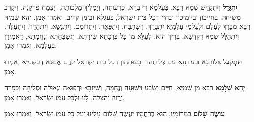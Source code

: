 
\textbf{יִתְגַּדַּל} וְיִתְקַדַּשׁ שְׁמֵהּ רַבָּא.  בְּעָלְמָא דִּי בְרָא, כִּרְעוּתֵה, וְיַמְלִיךְ מַלְכוּתֵה, וְיַצְמַח פֻּרְקָנֵה, וִיקָרֵב מְשִׁיחֵהּ.  בְּחַיֵּיכוֹן וּבְיוֹמֵיכוֹן וּבְחַיֵּי דְכָל בֵּית יִשְׂרָאֵל, בַּעֲגָלָא וּבִזְמַן קָרִיב, וְאִמְרוּ אָמֵן.  יְהֵא שְׁמֵיהּ רַבָּא מְבָרַךְ לְעָלַם וּלְעָלְמֵי עָלְמַיָּא יִתְבָּרַךְ. וְיִשְׁתַּבַּח. וְיִתְפָּאַר. וְיִתְרוֹמַם. וְיִתְנַשֵּׂא. וְיִתְהַדָּר. וְיִתְעַלֶּה. וְיִתְהַלָּל שְׁמֵהּ דְּקֻדְשָׁא, בְּרִיךְ הוּא.  לְעֵלָּא מִן כָּל בִּרְכָתָא שִׁירָתָא, תֻּשְׁבְּחָתָא וְנֶחֱמָתָא, דַּאֲמִירָן בְּעָלְמָא, וְאִמְרוּ אָמֵן: 

\textbf{תִּתְקַבַּל} צְלוֹתָנָא וּבָעוּתָנָא עִם צְלוֹתְהוֹן וּבָעוּתְהוֹן דְכָל בֵּית יִשְׂרָאֵל קֹדֶם אֲבוּנָא דְבִשְׁמַיָּא וְאִמְרוּ אָמֵן. 

\textbf{יְהֵא שְׁלָמָא} רַבָּא מִן שְׁמַיָּא, חַיִּים וְשָׂבָע וִישׁוּעָה וְנֶחָמָה, וְשֵׁיזָבָא וּרְפוּאָה וּגְאוּלָה וּסְלִיחָה וְכַפָּרָה וְרֶוַח וְהַצָּלָה, לָנוּ וּלְכָל עַמּוֹ יִשְׂרָאֵל, וְאִמְרוּ אָמֵן. 

\textbf{עוֹשֶׂה שָׁלוֹם} בִמְרוֹמָיו, הוּא בְּרַחֲמָיו יַעֲשֶׂה שָׁלוֹם עָלֵינוּ וְעַל כָּל עַמּוֹ יִשְׂרָאֵל, וְאִמְרוּ אָמֵן. 

